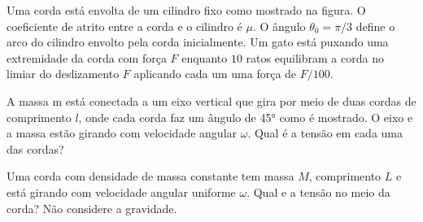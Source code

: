 \documentclass[]{IMTexam}
\begin{document}
\begin{questions}
\begin{parts}
		\begin{solution}

		\end{solution}

	\end{parts}

	\question Uma corda está envolta de um cilindro fixo como mostrado na figura. O coeficiente de atrito entre a corda e o cilindro é $\mu$. O ângulo $ \theta_0 = \pi/3 $ define o arco do cilindro envolto pela corda inicialmente. Um gato está puxando uma extremidade da corda com força $ F $ enquanto $ 10 $ ratos equilibram a corda no limiar do deslizamento $ F $ aplicando cada um uma força de $ F/100 $.


	\question A massa m está conectada a um eixo vertical que gira por meio de duas cordas de comprimento $ l $, onde cada corda faz um ângulo de \ang{45} como é mostrado. O eixo e a massa estão girando com velocidade angular $ \omega $. Qual é a tensão em cada uma das cordas?

	\begin{solution}

	\end{solution}

	\question Uma corda com densidade de massa constante tem massa $ M $, comprimento $ L $ e está girando com velocidade angular uniforme $ \omega $. Qual e a tensão no meio da corda? Não considere a gravidade.

	\begin{solution}


\end{solution}
\end{questions}
\end{document}

